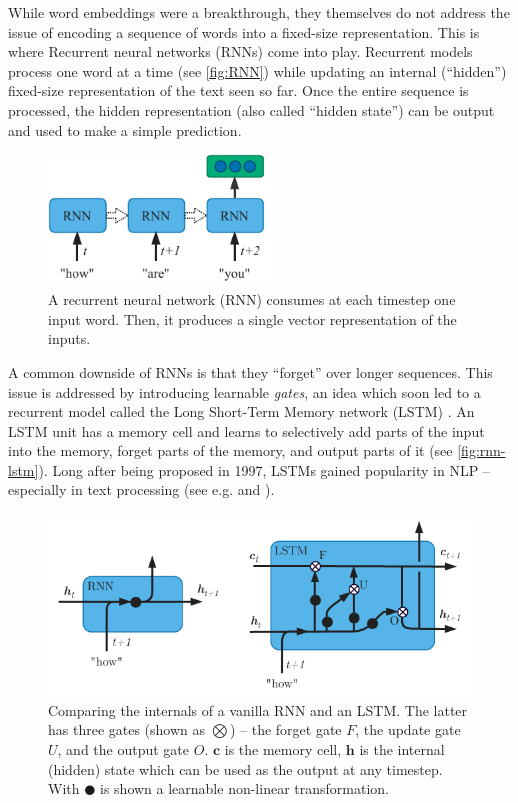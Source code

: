 \documentclass[bsc,frontabs,singlespacing,parskip,deptreport]{infthesis}
\begin{document}
{{    %
    While word embeddings were a breakthrough, they themselves do not address the issue of encoding a sequence of words into a fixed-size representation. This is where Recurrent neural networks (RNNs) \citep{Rumelhart_1986} come into play.
    Recurrent models process one word at a time (see \autoref{fig:RNN}) while updating an internal (``hidden'') fixed-size representation of the text seen so far.
    Once the entire sequence is processed, the hidden representation (also called ``hidden state'') can be output and used to make a simple prediction.
    \begin{figure}[h!t]
      \centering
      \includegraphics[width=6cm]{graphics/rnn}
      \caption{A recurrent neural network (RNN) consumes at each timestep one input word. Then, it produces a single vector representation of the inputs.}
      \label{fig:RNN}
    \end{figure}
    A common downside of RNNs is that they ``forget'' over longer sequences. This issue is addressed by introducing learnable \textit{gates}, an idea which soon led to a recurrent model called the Long Short-Term Memory network (LSTM) \citep{Hochreiter_Schmidhuber_1997}. An LSTM unit has a memory cell and learns to selectively add parts of the input into the memory, forget parts of the memory, and output parts of it (see \autoref{fig:rnn-lstm}). Long after being proposed in 1997, LSTMs gained popularity in NLP -- especially in text processing (see e.g. \citet{Mikolov_2010} and \citet{Graves_2013}). 
    \begin{figure}[h!t]
      \centering
      \includegraphics[width=13cm]{graphics/rnn-lstm}
      \caption{Comparing the internals of a vanilla RNN and an LSTM. The latter has three gates (shown as $\bigotimes$) -- the forget gate $F$, the update gate $U$, and the output gate $O$. $\bm{c}$ is the memory cell, $\bm{h}$ is the internal (hidden) state which can be used as the output at any timestep. With $\CIRCLE$ is shown a learnable non-linear transformation.}
      \label{fig:rnn-lstm}
    \end{figure}

}}
\end{document}
